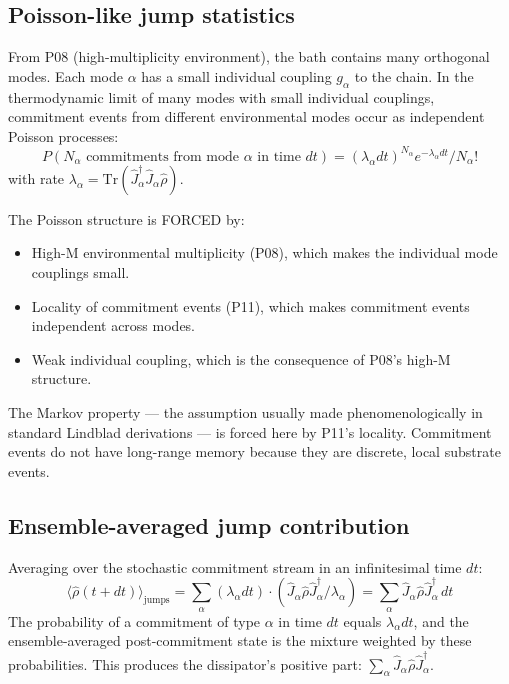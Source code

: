 \documentclass[11pt,a4paper]{article}
\begin{document}
\subsection{Poisson-like jump statistics}

From P08 (high-multiplicity environment), the bath contains many orthogonal modes. Each mode $\alpha$ has a small individual coupling $g_\alpha$ to the chain. In the thermodynamic limit of many modes with small individual couplings, commitment events from different environmental modes occur as independent Poisson processes:
\[
P(N_\alpha \text{ commitments from mode } \alpha \text{ in time } dt) = (\lambda_\alpha dt)^{N_\alpha} e^{-\lambda_\alpha dt}/N_\alpha!
\]
with rate $\lambda_\alpha = \mathrm{Tr}(\hat J_\alpha^\dagger \hat J_\alpha \hat\rho)$.

The Poisson structure is FORCED by:
\begin{itemize}[noitemsep]
  \item High-M environmental multiplicity (P08), which makes the individual mode couplings small.
  \item Locality of commitment events (P11), which makes commitment events independent across modes.
  \item Weak individual coupling, which is the consequence of P08's high-M structure.
\end{itemize}

The Markov property --- the assumption usually made phenomenologically in standard Lindblad derivations --- is forced here by P11's locality. Commitment events do not have long-range memory because they are discrete, local substrate events.

\subsection{Ensemble-averaged jump contribution}

Averaging over the stochastic commitment stream in an infinitesimal time $dt$:
\[
\langle\hat\rho(t + dt)\rangle_{\mathrm{jumps}} = \sum_\alpha (\lambda_\alpha dt)\cdot(\hat J_\alpha \hat\rho \hat J_\alpha^\dagger/\lambda_\alpha) = \sum_\alpha \hat J_\alpha \hat\rho \hat J_\alpha^\dagger\, dt
\]
The probability of a commitment of type $\alpha$ in time $dt$ equals $\lambda_\alpha dt$, and the ensemble-averaged post-commitment state is the mixture weighted by these probabilities. This produces the dissipator's positive part: $\sum_\alpha \hat J_\alpha \hat\rho \hat J_\alpha^\dagger$.
\end{document}
